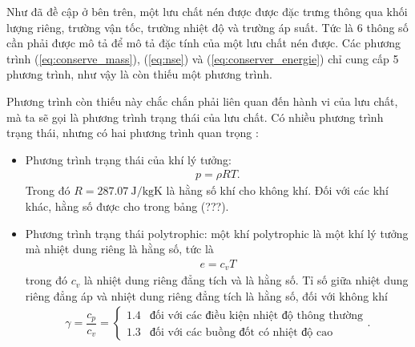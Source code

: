 Như đã đề cập ở bên trên, một lưu chất nén được được đặc trưng thông qua khối lượng riêng, trường vận tốc, trường nhiệt độ và trường áp suất. Tức là 6 thông số cần phải được mô tả để mô tả đặc tính của một lưu chất nén được. Các phương trình (\ref{eq:conserve_mass}), (\ref{eq:nse}) và (\ref{eq:conserver_energie}) chỉ cung cấp 5 phương trình, như vậy là còn thiếu một phương trình.

Phương trình còn thiếu này chắc chắn phải liên quan đến hành vi của lưu chất, mà ta sẽ gọi là phương trình trạng thái của lưu chất. Có nhiều phương trình trạng thái, nhưng có hai phương trình quan trọng :
\begin{itemize}
	\item Phương trình trạng thái của khí lý tưởng:
        \begin{align}
            p = \rho RT.
        \end{align}
	Trong đó $R=\qty{287.07}{\joule\per\kilogram\kelvin}$ là hằng số khí cho không khí. Đối với các khí khác, hằng số được cho trong bảng (???).
    \item Phương trình trạng thái polytrophic: một khí polytrophic là một khí lý tưởng mà nhiệt dung riêng là hằng số, tức là
        \begin{align}
            e = c_vT
        \end{align}
	trong đó $c_v$ là nhiệt dung riêng đẳng tích và là hằng số. Tỉ số giữa nhiệt dung riêng đẳng áp và nhiệt dung riêng đẳng tích là hằng số, đối với không khí
        \begin{align}
            \gamma = \dfrac{c_p}{c_v} = \begin{cases}
                1.4 & \text{đối với các điều kiện nhiệt độ thông thường}\\
                1.3 & \text{đối với các buồng đốt có nhiệt độ cao}
            \end{cases}.
        \end{align}
\end{itemize}

